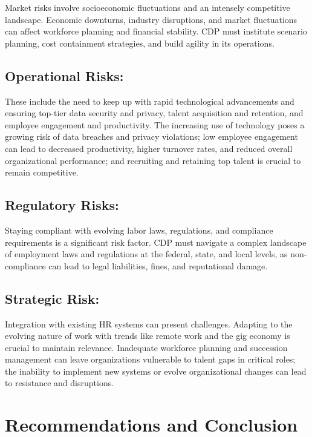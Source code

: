 \documentclass[
  a4paper,
]{book}
\begin{document}
Market risks involve socioeconomic fluctuations and an intensely
competitive landscape. Economic downturns, industry disruptions, and
market fluctuations can affect workforce planning and financial
stability. CDP must institute scenario planning, cost containment
strategies, and build agility in its operations.

\hypertarget{operational-risks}{%
\subsection{Operational Risks:}\label{operational-risks}}

These include the need to keep up with rapid technological advancements
and ensuring top-tier data security and privacy, talent acquisition and
retention, and employee engagement and productivity. The increasing use
of technology poses a growing risk of data breaches and privacy
violations; low employee engagement can lead to decreased productivity,
higher turnover rates, and reduced overall organizational performance;
and recruiting and retaining top talent is crucial to remain
competitive.

\hypertarget{regulatory-risks}{%
\subsection{Regulatory Risks:}\label{regulatory-risks}}

Staying compliant with evolving labor laws, regulations, and compliance
requirements is a significant risk factor. CDP must navigate a complex
landscape of employment laws and regulations at the federal, state, and
local levels, as non-compliance can lead to legal liabilities, fines,
and reputational damage.

\hypertarget{strategic-risk}{%
\subsection{Strategic Risk:}\label{strategic-risk}}

Integration with existing HR systems can present challenges. Adapting to
the evolving nature of work with trends like remote work and the gig
economy is crucial to maintain relevance. Inadequate workforce planning
and succession management can leave organizations vulnerable to talent
gaps in critical roles; the inability to implement new systems or evolve
organizational changes can lead to resistance and disruptions.

\hypertarget{recommendations-and-conclusion}{%
\section{Recommendations and
Conclusion}\label{recommendations-and-conclusion}}
\end{document}
